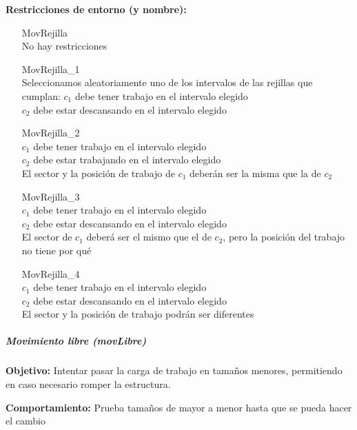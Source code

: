 \textbf{Restricciones de entorno (y nombre):}
\begin{enumerate}[align=parleft, labelsep=2cm, itemindent=5em, font=\itshape]
    \item[MovRejilla]\mbox{}\\No hay restricciones

    \item[MovRejilla\_1]\mbox{}\\
    Seleccionamos aleatoriamente uno de los intervalos de las rejillas que cumplan:
    $c_1$ debe tener trabajo en el intervalo elegido \\
    $c_2$ debe estar descansando en el intervalo elegido

    \item[MovRejilla\_2]\mbox{}\\
    $c_1$ debe tener trabajo en el intervalo elegido \\
    $c_2$ debe estar trabajando en el intervalo elegido \\
    El sector y la posición de trabajo de $c_1$ deberán ser la misma que la de $c_2$

    \item[MovRejilla\_3]\mbox{}\\
    $c_1$ debe tener trabajo en el intervalo elegido \\
    $c_2$ debe estar descansando en el intervalo elegido \\
    El sector de $c_1$ deberá ser el mismo que el de $c_2$, pero la posición del trabajo no tiene por qué

    \item[MovRejilla\_4]\mbox{}\\
    $c_1$ debe tener trabajo en el intervalo elegido \\
    $c_2$ debe estar descansando en el intervalo elegido \\
    El sector y la posición de trabajo podrán ser diferentes
\end{enumerate}

\subparagraph{Movimiento libre (\textit{movLibre})}
\label{entorno:movLibre}

\textbf{Objetivo:} Intentar pasar la carga de trabajo en tamaños menores, permitiendo en caso necesario romper la estructura.

\textbf{Comportamiento:} Prueba tamaños de mayor a menor hasta que se pueda hacer el cambio

